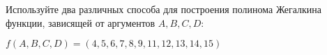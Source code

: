 \question Используйте два различных способа для построения полинома Жегалкина функции, зависящей от аргументов $A, B, C, D$:

$f(A,B,C,D) = (4,5,6,7,8,9,11,12,13,14,15)$